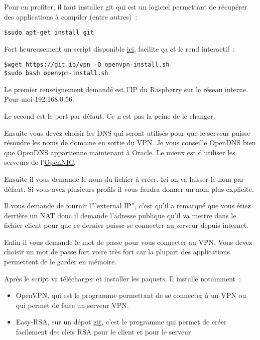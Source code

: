 Pour en profiter, il faut installer git qui est un logiciel permettant de récupérer des applications à compiler (entre autres)~:
\begin{verbatim}
$sudo apt-get install git
\end{verbatim}

Fort heureusement un script disponible \href{https://github.com/Nyr/openvpn-install}{ici}, facilite ça et le rend interactif~:

\begin{verbatim}
$wget https://git.io/vpn -O openvpn-install.sh 
$sudo bash openvpn-install.sh
\end{verbatim}

Le premier renseignement demandé est l'IP du Raspberry sur le réseau interne. Pour moi 192.168.0.56.

Le second est le port par défaut. Ce n'est pas la peine de le changer.

Ensuite vous devez choisir les DNS qui seront utilisés pour que le serveur puisse résoudre les noms de domaine en sortie du VPN. Je vous conseille OpenDNS bien que OpenDNS appartienne maintenant à Oracle. Le mieux est d'utiliser les serveurs de l'\href{https://www.opennicproject.org/}{OpenNIC}.

Ensuite il vous demande le nom du fichier à créer. Ici on va laisser le nom par défaut. Si vous avez plusieurs profils il vous faudra donner un nom plus explicite.

Il vous demande de fournir l'''external IP'', c'est qu'il a remarqué que vous étiez derrière un NAT donc il demande l'adresse publique qu'il va mettre dans le fichier client pour que ce dernier puisse se connecter au serveur depuis internet. 

Enfin il vous demande le mot de passe pour vous connecter au VPN. Vous devez choisir un mot de passe fort voire très fort car la plupart des applications permettent de le garder en mémoire. 

Après le script va télécharger et installer les paquets. Il installe notamment~:
\begin{itemize}
	\item OpenVPN, qui est le programme permettant de se connecter à un VPN ou qui permet de faire un serveur VPN.
	\item Easy-RSA, sur un dépot \href{https://github.com/OpenVPN/easy-rsa}{git}, c'est le programme qui permet de créer facilement des clefs RSA pour le client et pour le serveur. 
\end{itemize}

